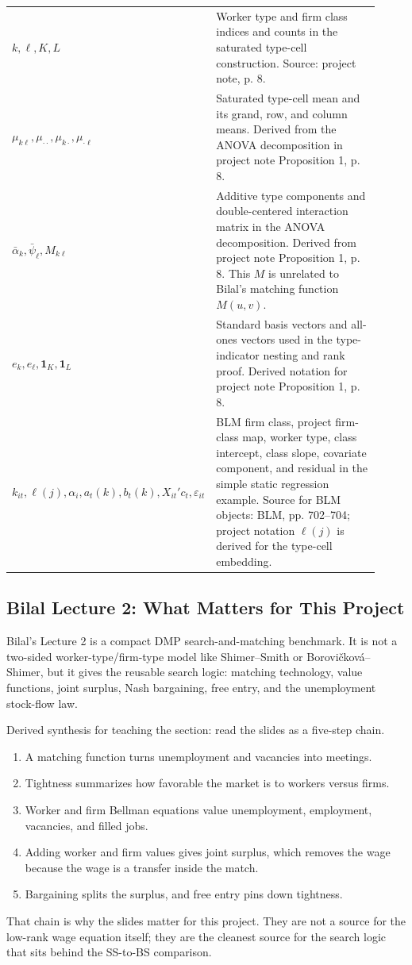 ﻿\documentclass[11pt]{article}
\newcommand{\1}{\mathbf{1}}
\begin{document}
\begin{longtable}{>{\raggedright\arraybackslash}p{0.24\linewidth}
                >{\raggedright\arraybackslash}p{0.68\linewidth}}
$k,\ell,K,L$ & Worker type and firm class indices and counts in the saturated type-cell construction. Source: project note, p. 8. \\
$\mu_{k\ell},\mu_{\cdot\cdot},\mu_{k\cdot},\mu_{\cdot\ell}$ & Saturated type-cell mean and its grand, row, and column means. Derived from the ANOVA decomposition in project note Proposition 1, p. 8. \\
$\bar\alpha_k,\bar\psi_\ell,M_{k\ell}$ & Additive type components and double-centered interaction matrix in the ANOVA decomposition. Derived from project note Proposition 1, p. 8. This $M$ is unrelated to Bilal's matching function $M(u,v)$. \\
$e_k,e_\ell,\1_K,\1_L$ & Standard basis vectors and all-ones vectors used in the type-indicator nesting and rank proof. Derived notation for project note Proposition 1, p. 8. \\
$k_{it},\ell(j),\alpha_i,a_t(k),b_t(k),X_{it}'c_t,\varepsilon_{it}$ & BLM firm class, project firm-class map, worker type, class intercept, class slope, covariate component, and residual in the simple static regression example. Source for BLM objects: BLM, pp. 702--704; project notation $\ell(j)$ is derived for the type-cell embedding. \\
\bottomrule
\end{longtable}

\subsection{Bilal Lecture 2: What Matters for This Project}

Bilal's Lecture 2 is a compact DMP search-and-matching benchmark. It is not a
two-sided worker-type/firm-type model like Shimer--Smith or
Borovi\v{c}kov\'a--Shimer, but it gives the reusable search logic: matching
technology, value functions, joint surplus, Nash bargaining, free entry, and
the unemployment stock-flow law.

Derived synthesis for teaching the section: read the slides as a five-step
chain.
\begin{enumerate}
\item A matching function turns unemployment and vacancies into meetings.
\item Tightness summarizes how favorable the market is to workers versus firms.
\item Worker and firm Bellman equations value unemployment, employment,
vacancies, and filled jobs.
\item Adding worker and firm values gives joint surplus, which removes the wage
because the wage is a transfer inside the match.
\item Bargaining splits the surplus, and free entry pins down tightness.
\end{enumerate}
That chain is why the slides matter for this project. They are not a source for
the low-rank wage equation itself; they are the cleanest source for the search
logic that sits behind the SS-to-BS comparison.
\end{document}
